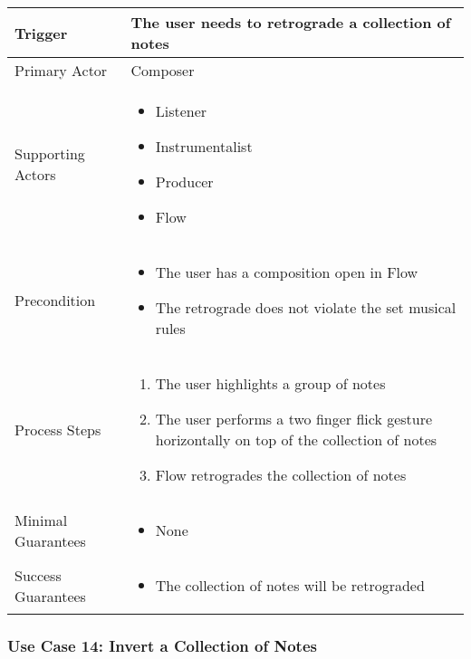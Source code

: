 \begin{tabularx}{\textwidth}{|X|X|}
\hline
Trigger & 
The user needs to retrograde a collection of notes \\
\hline
Primary Actor & 
Composer \\
\hline
Supporting Actors & 
\begin{itemize}
\item Listener
\item Instrumentalist
\item Producer
\item Flow
\end{itemize} \\
\hline
Precondition & 
\begin{itemize}
\item The user has a composition open in Flow
\item The retrograde does not violate the set musical rules
\end{itemize} \\
\hline
Process Steps & 
\begin{enumerate}
\item The user highlights a group of notes
\item The user performs a two finger flick gesture horizontally on top of the collection of notes
\item Flow retrogrades the collection of notes
\end{enumerate} \\
\hline
Minimal Guarantees & 
\begin{itemize}
  \item None
\end{itemize} \\
\hline
Success Guarantees & 
\begin{itemize}
  \item The collection of notes will be retrograded
\end{itemize} \\
\hline
\end{tabularx}

\subsubsection{Use Case 14: Invert a Collection of Notes}

